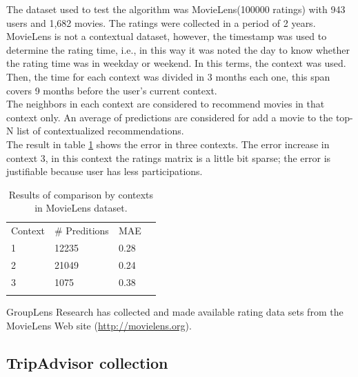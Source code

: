 The dataset used to test the algorithm was MovieLens(100000 ratings)
with 943 users and 1,682 movies. The ratings were collected in a
period  of 2 years. \\MovieLens is not a contextual dataset, however,
the  timestamp was used to determine the rating time, i.e., in this
way it  was noted the day to know whether the rating time was in
weekday or  weekend. In this terms, the context was used. Then, the
time for each  context was divided in 3 months each one, this span
covers 9 months  before the user's current context. \\ The neighbors
in each context are  considered to recommend movies in that context
only.  An average of  predictions are considered for add a movie to
the top-N list of contextualized recommendations. \\ The result in
table \ref{tab:contexts} shows the error in three contexts. The
error increase in context 3, in this  context the ratings matrix is a
little bit sparse;  the error is  justifiable because user has less
participations.
\begin{table}
\small
\captionsetup{font=footnotesize}
\caption{Results of comparison by contexts in MovieLens dataset.}
\label{tab:contexts} 
\small
\centering
\begin{tabular}{llll}
\hline\noalign{\smallskip}
Context & \# Preditions & MAE &    \\
\noalign{\smallskip}\hline\noalign{\smallskip}
1 & 12235 & 0.28 \\
2 & 21049 & 0.24 \\
3 & 1075  & 0.38 \\
\noalign{\smallskip}\hline
\end{tabular}
\end{table}
GroupLens Research has collected and made available rating data sets
from the MovieLens Web site (\url{http://movielens.org}). 

\subsection{TripAdvisor collection} 

